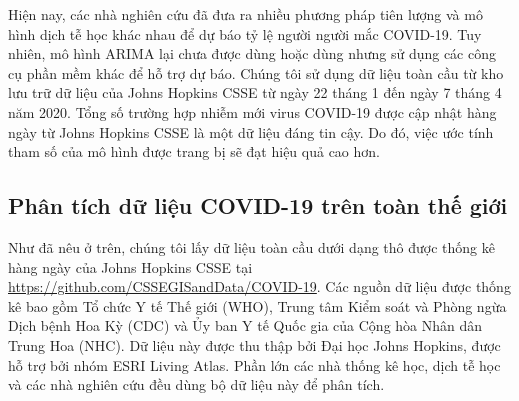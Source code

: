 \documentclass[12pt, a4paper,oneside]{book}
\theoremstyle{definition}
\begin{document}
Hiện nay, các nhà nghiên cứu đã đưa ra nhiều phương pháp tiên lượng và mô hình dịch tễ học khác nhau để dự báo tỷ lệ người người mắc COVID-19. Tuy nhiên, mô hình ARIMA lại chưa được dùng hoặc dùng nhưng sử dụng các công cụ phần mềm khác để hỗ trợ dự báo. Chúng tôi sử dụng dữ liệu toàn cầu từ kho lưu trữ dữ liệu của Johns Hopkins CSSE từ ngày 22 tháng 1 đến ngày 7 tháng 4 năm 2020. Tổng số trường hợp nhiễm mới virus COVID-19 được cập nhật hàng ngày từ Johns Hopkins CSSE là một dữ liệu đáng tin cậy. Do đó, việc ước tính tham số của mô hình  được trang bị sẽ đạt hiệu quả cao hơn.
\subsection{Phân tích dữ liệu COVID-19 trên toàn thế giới}
Như đã nêu ở trên, chúng tôi lấy dữ liệu toàn cầu dưới dạng thô được thống kê hàng ngày của Johns Hopkins CSSE tại \url{https://github.com/CSSEGISandData/COVID-19}. Các nguồn dữ liệu được thống kê bao gồm Tổ chức Y tế Thế giới (WHO), Trung tâm Kiểm soát và Phòng ngừa Dịch bệnh Hoa Kỳ (CDC) và Ủy ban Y tế Quốc gia của Cộng hòa Nhân dân Trung Hoa (NHC). Dữ liệu này được thu thập bởi Đại học Johns Hopkins, được hỗ trợ bởi nhóm ESRI Living Atlas. Phần lớn các nhà thống kê học, dịch tễ học và các nhà nghiên cứu đều dùng bộ dữ liệu này để phân tích.
\end{document}
